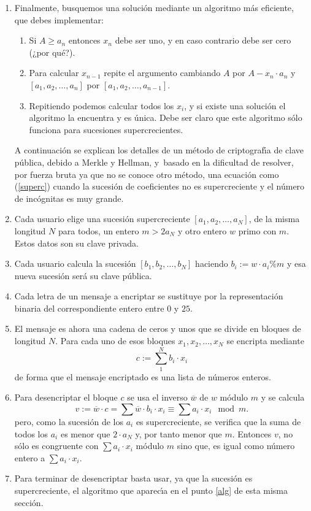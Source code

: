 \begin{enumerate}
\item\label{alg} Finalmente, busquemos una soluci\'on mediante un algoritmo
m\'as eficiente, que debes implementar:
\begin{enumerate}
\item  Si $A\ge a_n$ entonces $x_n$ debe ser uno, y en caso contrario debe ser
cero (¿por qu\'e?).
\item    Para calcular $x_{n-1}$ repite el argumento cambiando $A$ por
$A-x_n\cdot a_n$ y $[a_1,a_2,\dots,a_n]$ por $[a_1,a_2,\dots,a_{n-1}]$.
\item     Repitiendo podemos calcular todos los $x_i$, y si existe una
soluci\'on el algoritmo la encuentra y es \'unica. Debe ser claro que este
algoritmo s\'olo funciona para sucesiones supercrecientes.
\end{enumerate}
A continuaci\'on se explican los detalles de un m\'etodo de 
criptograf\'{\i}a de clave p\'ublica, debido a Merkle y Hellman, 
y~basado en la dificultad de resolver,
por fuerza bruta ya que no se conoce otro m\'etodo,  una ecuaci\'on como 
 (\ref{superc}) cuando la sucesi\'on de coeficientes no es supercreciente y el
n\'umero de inc\'ognitas es muy grande. 
\item Cada usuario elige una sucesi\'on supercreciente $[a_1,a_2,\dots,a_N]$, 
de la misma longitud $N$ para todos, un entero $m>2a_N$ y otro entero $w$ primo
con $m$. Estos datos son su clave privada.
\item Cada usuario calcula la sucesi\'on $[b_1,b_2,\dots,b_N]$ haciendo
$b_i:=w\cdot a_i \%m$ y esa nueva sucesi\'on ser\'a su clave p\'ublica.
\item Cada letra de un mensaje a encriptar se sustituye por la representaci\'on
binaria del correspondiente  entero entre  $0$ y  $25.$
\item El mensaje es ahora una cadena  de ceros y unos que se divide en bloques
de longitud $N$. Para cada uno de esos bloques $x_1,x_2,\dots,x_N$ se encripta
mediante 
\[c:=\sum_1^N b_i\cdot x_i\]
de forma que el mensaje encriptado es una lista de n\'umeros enteros. 
\item Para desencriptar el bloque $c$ se usa el inverso $\overline{w}$ de $w$
m\'odulo $m$ y se calcula 
\[v:=\overline{w}\cdot c=\sum \overline{w}\cdot b_i\cdot x_i\equiv\sum a_i\cdot
x_i\mod m.\]
\noindent pero, como la sucesi\'on de los $a_i$ es supercreciente, se verifica
que la suma de todos los $a_i$ es menor que $2\cdot a_N$ y, por tanto menor que
$m$. 
Entonces $v$, no s\'olo es congruente con $\sum a_i\cdot x_i$ m\'odulo $m$ sino
que,  es igual como n\'umero entero a $\sum a_i\cdot x_i$.
\item Para terminar de desencriptar basta usar, ya que la sucesi\'on es
supercreciente,  el algoritmo que aparec\'{\i}a en el punto \ref{alg} de esta 
misma secci\'on.
\end{enumerate}

